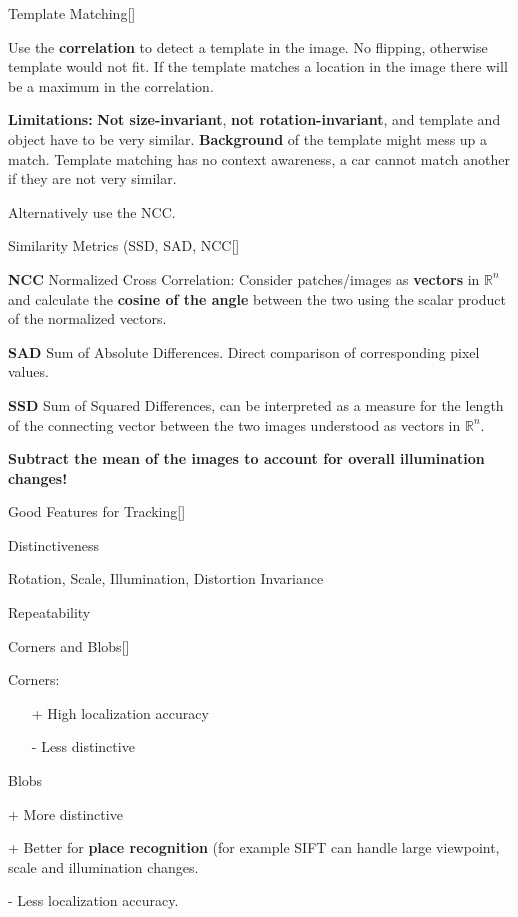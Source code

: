 \documentclass[10pt,a4paper]{scrartcl}
\begin{document}
\begin{multicols*}{2}
\begin{QandA}{Template Matching}[\Definition]
\item Use the \textbf{correlation} to detect a template in the image. No flipping, otherwise template would not fit. If the template matches a location in the image there will be a maximum in the correlation.
\item \textbf{Limitations:} \textbf{Not size-invariant}, \textbf{not rotation-invariant}, and template and object have to be very similar. \textbf{Background} of the template might mess up a match. Template matching has no context awareness, a car cannot match another if they are not very similar.
\item Alternatively use the NCC.
\end{QandA}

\begin{QandA}{Similarity Metrics (SSD, SAD, NCC}[\Definition]
\item \textbf{NCC} Normalized Cross Correlation: Consider patches/images as \textbf{vectors} in $\mathbb{R}^n$ and calculate the \textbf{cosine of the angle} between the two using the scalar product of the normalized vectors.
\item \textbf{SAD} Sum of Absolute Differences. Direct comparison of corresponding pixel values.
\item \textbf{SSD} Sum of Squared Differences, can be interpreted as a measure for the length of the connecting vector between the two images understood as vectors in $\mathbb{R}^n$.
\item \textbf{Subtract the mean of the images to account for overall illumination changes!}
\end{QandA}

\begin{QandA}{Good Features for Tracking}[\Definition]
\item Distinctiveness
\item Rotation, Scale, Illumination, Distortion Invariance
\item Repeatability
\end{QandA}

\begin{QandA}{Corners and Blobs}[\Comparison]
\item Corners:
\begin{itemize}
\item[+] High localization accuracy
\item[-] Less distinctive
\end{itemize}
\item Blobs
\item[+] More distinctive
\item[+] Better for \textbf{place recognition} (for example SIFT can handle large viewpoint, scale and illumination changes.
\item[-] Less localization accuracy.
\end{QandA}


\end{multicols*}
\end{document}
